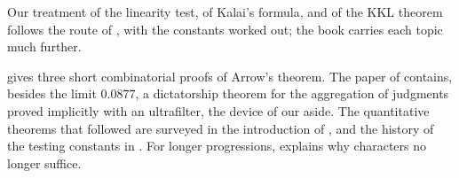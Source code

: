 \begin{refsection}
\notesandrefs
Our treatment of the linearity test, of Kalai's formula, and of the KKL theorem follows the route of \textcite{ODonnell2014}, with the constants worked out; the book carries each topic much further.

\Textcite{Geanakoplos2005} gives three short combinatorial proofs of Arrow's theorem. The paper of \textcite{Guilbaud1952} contains, besides the limit $0.0877$, a dictatorship theorem for the aggregation of judgments proved implicitly with an ultrafilter, the device of our aside. The quantitative theorems that followed \textcite{Kalai2002} are surveyed in the introduction of \textcite{Keller2012}, and the history of the testing constants in \textcite{BellareEtAl1996}. For longer progressions, \textcite{Gowers2001} explains why characters no longer suffice.

\printchapterbib
\end{refsection}

